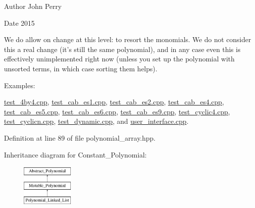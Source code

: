 \begin{DoxyAuthor}{Author}
John Perry 
\end{DoxyAuthor}
\begin{DoxyDate}{Date}
2015
\end{DoxyDate}
We do allow on change at this level\+: to resort the monomials. We do not consider this a real change (it's still the same polynomial), and in any case even this is effectively unimplemented right now (unless you set up the polynomial with unsorted terms, in which case sorting them helps). \begin{Desc}
\item[Examples\+: ]\par
\hyperlink{test_4by4_8cpp-example}{test\+\_\+4by4.\+cpp}, \hyperlink{test_cab_es1_8cpp-example}{test\+\_\+cab\+\_\+es1.\+cpp}, \hyperlink{test_cab_es2_8cpp-example}{test\+\_\+cab\+\_\+es2.\+cpp}, \hyperlink{test_cab_es4_8cpp-example}{test\+\_\+cab\+\_\+es4.\+cpp}, \hyperlink{test_cab_es5_8cpp-example}{test\+\_\+cab\+\_\+es5.\+cpp}, \hyperlink{test_cab_es6_8cpp-example}{test\+\_\+cab\+\_\+es6.\+cpp}, \hyperlink{test_cab_es9_8cpp-example}{test\+\_\+cab\+\_\+es9.\+cpp}, \hyperlink{test_cyclic4_8cpp-example}{test\+\_\+cyclic4.\+cpp}, \hyperlink{test_cyclicn_8cpp-example}{test\+\_\+cyclicn.\+cpp}, \hyperlink{test_dynamic_8cpp-example}{test\+\_\+dynamic.\+cpp}, and \hyperlink{user_interface_8cpp-example}{user\+\_\+interface.\+cpp}.\end{Desc}


Definition at line 89 of file polynomial\+\_\+array.\+hpp.

Inheritance diagram for Constant\+\_\+\+Polynomial\+:\begin{figure}[H]
\begin{center}
\leavevmode
\includegraphics[height=2.000000cm]{group__polygroup}
\end{center}
\end{figure}
